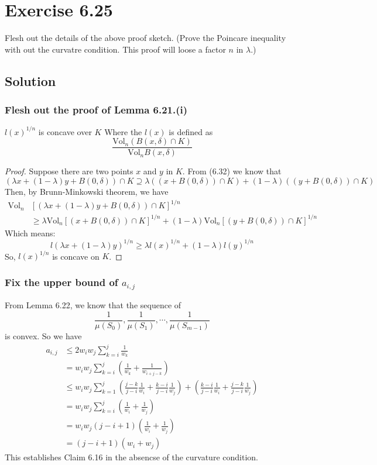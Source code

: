 \documentclass{article}
\begin{document}
\section{Exercise 6.25}
Flesh out the details of the above proof sketch. (Prove the Poincare inequality with out the curvatre condition. This proof will loose a factor $n$ in $\lambda$.)
\subsection{Solution}
\subsubsection{Flesh out the proof of Lemma 6.21.(i)}
\begin{tcolorbox}[title={Recall It Here:}]
  \centering $l(x)^{1/n}$ is concave over $K$
  \tcblower
  Where the $l(x)$ is defined as
  \[\frac{\mathrm{Vol}_n (B(x, \delta)\cap K)}{\mathrm{Vol}_n B(x, \delta)}\]
\end{tcolorbox}
\begin{proof}
  Suppose there are two points $x$ and $y$ in $K$. From (6.32) we know that
  \[(\lambda x + (1-\lambda)y + B(0, \delta)) \cap K \supseteq \lambda((x + B(0, \delta))\cap K) + (1-\lambda)((y + B(0, \delta))\cap K)\]
  Then, by Brunn-Minkowski theorem, we have
  \begin{align*}
  \mathrm{Vol}_n&[(\lambda x + (1-\lambda)y + B(0, \delta)) \cap K]^{1/n} \\
    &\geq \lambda\mathrm{Vol}_n[(x + B(0, \delta))\cap K]^{1/n} + (1-\lambda)\mathrm{Vol}_n[(y + B(0, \delta))\cap K]^{1/n}
  \end{align*}
  Which means:
  \[l(\lambda x + (1-\lambda)y)^{1/n} \geq \lambda l(x)^{1/n} + (1-\lambda)l(y)^{1/n}\]
  So, $l(x)^{1/n}$ is concave on $K$.
\end{proof}
\subsubsection{Fix the upper bound of $a_{i, j}$}
From Lemma 6.22, we know that the sequence of 
\[\frac{1}{\mu(S_0)}, \frac{1}{\mu(S_1)},\cdots, \frac{1}{\mu(S_{m-1})}\]
is convex.
So we have
\begin{align*}
  a_{i,j} &\leq 2w_iw_j\sum_{k=i}^j \frac{1}{w_k} \\
  &= w_iw_j \sum_{k=i}^j (\frac{1}{w_k} + \frac{1}{w_{i + j - k}}) \\
  &\leq w_iw_j \sum_{k=1}^j (\frac{j-k}{j-i}\frac{1}{w_i} + \frac{k-i}{j-i}\frac{1}{w_j}) + (\frac{k-i}{j-i}\frac{1}{w_i} + \frac{j-k}{j-i}\frac{1}{w_j}) \\
  &= w_iw_j \sum_{k=i}^j (\frac{1}{w_i} + \frac{1}{w_j}) \\
  &= w_iw_j (j-i+1) (\frac{1}{w_i} + \frac{1}{w_j}) \\
  &= (j-i+1)(w_i + w_j)
\end{align*}
This establishes Claim 6.16 in the absencse of the curvature condition.
\end{document}
